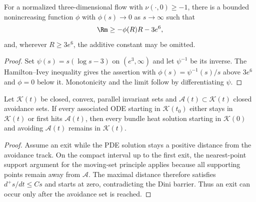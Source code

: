 \begin{corollary}
\label{cor:chow-ii-almost-nonnegative-curvature}
For a normalized three-dimensional flow with $\nu(\cdot,0)\ge-1$, there is a
bounded nonincreasing function $\phi$ with $\phi(s)\to0$ as $s\to\infty$ such
that
\[
\Rm\ge-\phi(R)R-3e^6,
\]
and, wherever $R\ge3e^6$, the additive constant may be omitted.
\end{corollary}
\begin{proof}
\sketch
Set $\psi(s)=s(\log s-3)$ on $(e^3,\infty)$ and let $\psi^{-1}$ be its
inverse.  The Hamilton--Ivey inequality gives the assertion with
$\phi(s)=\psi^{-1}(s)/s$ above $3e^6$ and $\phi=0$ below it.  Monotonicity and
the limit follow by differentiating $\psi$.
\end{proof}

\begin{theorem}
\label{thm:chow-ii-system-avoidance-wmp}
Let $\mathcal K(t)$ be closed, convex, parallel invariant sets and
$\mathcal A(t)\subset\mathcal K(t)$ closed avoidance sets.  If every associated
ODE starting in $\mathcal K(t_0)$ either stays in $\mathcal K(t)$ or first hits
$\mathcal A(t)$, then every bundle heat solution starting in $\mathcal K(0)$
and avoiding $\mathcal A(t)$ remains in $\mathcal K(t)$.
\end{theorem}
\begin{proof}
\sketch
{}
Assume an exit while the PDE solution stays a positive distance from the
avoidance track.  On the compact interval up to the first exit, the nearest-point
support argument for the moving-set principle applies because all supporting
points remain away from $\mathcal A$.  The maximal distance therefore satisfies
$d^+s/dt\le Cs$ and starts at zero, contradicting the Dini barrier.  Thus an
exit can occur only after the avoidance set is reached.
\end{proof}


